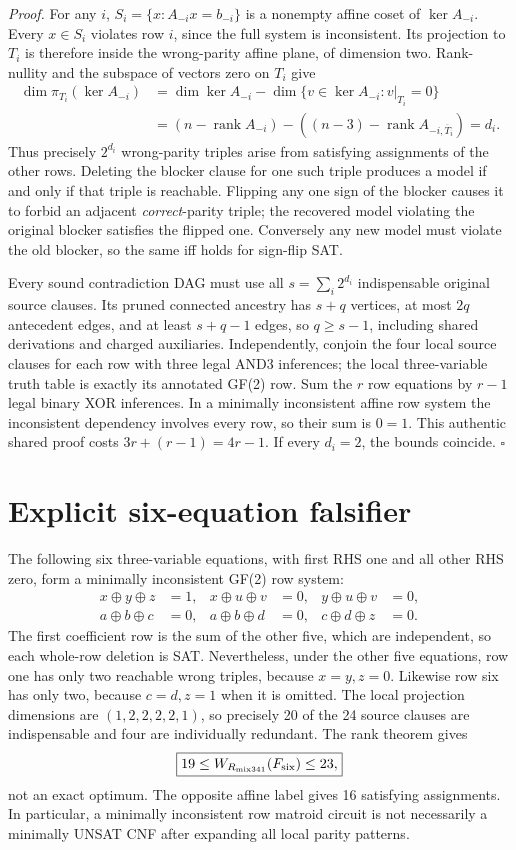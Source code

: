 \documentclass[11pt]{article}
\begin{document}
\noindent\emph{Proof.}
For any $i$, $S_i=\{x:A_{-i}x=b_{-i}\}$ is a nonempty affine coset of $\ker A_{-i}$. Every $x\in S_i$ violates row $i$, since the full system is inconsistent. Its projection to $T_i$ is therefore inside the wrong-parity affine plane, of dimension two. Rank-nullity and the subspace of vectors zero on $T_i$ give
\[
\begin{aligned}
\dim \pi_{T_i}(\ker A_{-i})
&=\dim\ker A_{-i}-
  \dim\{v\in\ker A_{-i}:v|_{T_i}=0\}\\
&=(n-\operatorname{rank}A_{-i})
-((n-3)-\operatorname{rank}A_{-i,\overline T_i})
=d_i.
\end{aligned}
\]
Thus precisely $2^{d_i}$ wrong-parity triples arise from satisfying assignments of the other rows. Deleting the blocker clause for one such triple produces a model if and only if that triple is reachable. Flipping any one sign of the blocker causes it to forbid an adjacent \emph{correct}-parity triple; the recovered model violating the original blocker satisfies the flipped one. Conversely any new model must violate the old blocker, so the same iff holds for sign-flip SAT.

Every sound contradiction DAG must use all $s=\sum_i 2^{d_i}$ indispensable original source clauses. Its pruned connected ancestry has $s+q$ vertices, at most $2q$ antecedent edges, and at least $s+q-1$ edges, so $q\ge s-1$, including shared derivations and charged auxiliaries. Independently, conjoin the four local source clauses for each row with three legal AND3 inferences; the local three-variable truth table is exactly its annotated GF(2) row. Sum the $r$ row equations by $r-1$ legal binary XOR inferences. In a minimally inconsistent affine row system the inconsistent dependency involves every row, so their sum is $0=1$. This authentic shared proof costs $3r+(r-1)=4r-1$. If every $d_i=2$, the bounds coincide. \hfill$\square$

\section*{Explicit six-equation falsifier}
The following six three-variable equations, with first RHS one and all other RHS zero, form a minimally inconsistent GF(2) row system:
\[
\begin{aligned}
x\oplus y\oplus z&=1,&x\oplus u\oplus v&=0,&y\oplus u\oplus v&=0,\\
a\oplus b\oplus c&=0,&a\oplus b\oplus d&=0,&c\oplus d\oplus z&=0.
\end{aligned}
\]
The first coefficient row is the sum of the other five, which are independent, so each whole-row deletion is SAT. Nevertheless, under the other five equations, row one has only two reachable wrong triples, because $x=y,z=0$. Likewise row six has only two, because $c=d,z=1$ when it is omitted. The local projection dimensions are $(1,2,2,2,2,1)$, so precisely 20 of the 24 source clauses are indispensable and four are individually redundant. The rank theorem gives
\[
\boxed{19\le W_{R_{\mathrm{mix341}}}(F_{\rm six})\le23,}
\]
not an exact optimum. The opposite affine label gives 16 satisfying assignments. In particular, a minimally inconsistent row matroid circuit is not necessarily a minimally UNSAT CNF after expanding all local parity patterns.
\end{document}
